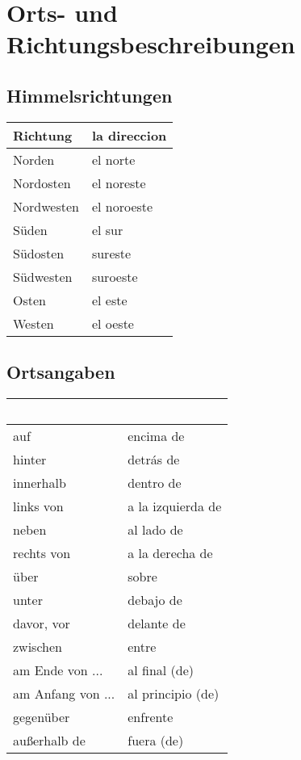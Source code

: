 \documentclass{spanish_summary}
\begin{document}
  \chapter*{Orts- und Richtungsbeschreibungen}
  \section*{Himmelsrichtungen}
  \begin{longtable}{p{} | p{}} 
    \textbf{Richtung}     & \textbf{la direccion}                                       \\ \hline
    Norden & el norte \\
    Nordosten & el noreste \\
    Nordwesten & el noroeste \\
    Süden & el sur \\
    Südosten & sureste \\
    Südwesten & suroeste \\
    Osten & el este \\
    Westen & el oeste \\
  \end{longtable}
  
  \section*{Ortsangaben}
  \begin{longtable}{p{} | p{}} 
    \textbf{~}     & \textbf{~}                                       \\ \hline
    auf & encima de \\
    hinter & detrás de \\
    innerhalb & dentro de \\
    links von & a la izquierda de \\
    neben & al lado de \\
    rechts von & a la derecha de\\
    über & sobre \\
    unter & debajo de \\
    davor, vor & delante de \\
    zwischen & entre \\    
    am Ende von ... & al final (de) \\
    am Anfang von ... & al principio (de)\\
    gegenüber & enfrente \\
    außerhalb de & fuera (de)
  \end{longtable}
  
\end{document}
